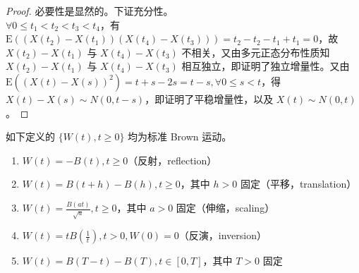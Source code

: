\documentclass[../main.tex]{subfiles}
\begin{document}
\begin{proof}
    必要性是显然的。下证充分性。\\
    $\forall0\leq t_1<t_2<t_3<t_4$，有 $\mathrm E((X(t_2)-X(t_1))(X(t_4)-X(t_3)))=t_2-t_2-t_1+t_1=0$，故 $X(t_2)-X(t_1)$ 与 $X(t_4)-X(t_3)$ 不相关，又由多元正态分布性质知 $X(t_2)-X(t_1)$ 与 $X(t_4)-X(t_3)$ 相互独立，即证明了独立增量性。又由 $\mathrm E((X(t)-X(s))^2)=t+s-2s=t-s,\forall0\leq s<t$，得 $X(t)-X(s)\sim N(0,t-s)$，即证明了平稳增量性，以及 $X(t)\sim N(0,t)$。
\end{proof}

\begin{proposition}
    如下定义的 $\{W(t),t\geq0\}$ 均为标准 Brown 运动。
    \begin{enumerate}
        \item $W(t)=-B(t),t\geq0$（反射，reflection）
        \item $W(t)=B(t+h)-B(h),t\geq0$，其中 $h>0$ 固定（平移，translation）
        \item $W(t)=\frac{B(at)}{\sqrt a},t\geq0$，其中 $a>0$ 固定（伸缩，scaling）
        \item $W(t)=tB(\frac1t),t>0,W(0)=0$（反演，inversion）
        \item $W(t)=B(T-t)-B(T),t\in[0,T]$，其中 $T>0$ 固定
    \end{enumerate}
\end{proposition}
\end{document}
